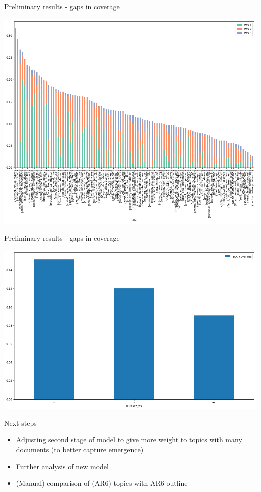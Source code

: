 \documentclass[9pt]{beamer}
\begin{document}
\begin{frame}{Preliminary results - gaps in coverage}


			\includegraphics[width=0.8\linewidth]{../plots/ipcc_topics_wg_654.png}


\end{frame}

\begin{frame}{Preliminary results - gaps in coverage}
	
	
	\includegraphics[width=0.8\linewidth]{../plots/ipcc_coverage_by_wg_654.png}
	
	
\end{frame}



\begin{frame}{Next steps}
	\begin{itemize}
		\item Adjusting second stage of model to give more weight to topics with many documents (to better capture emergence)
		\item Further analysis of new model
		\item (Manual) comparison of (AR6) topics with AR6 outline
	\end{itemize}
\end{frame}
\end{document}
